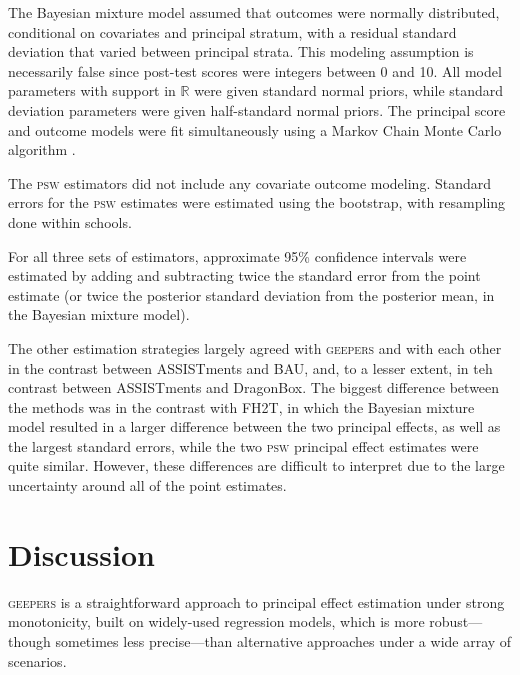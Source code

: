 \documentclass[]{article}
\begin{document}
The Bayesian mixture model assumed that outcomes were normally distributed, conditional on covariates and principal stratum, with a residual standard deviation that varied between principal strata. This modeling assumption is necessarily false since post-test scores were integers between 0 and 10. All model parameters with support in $\mathbb{R}$ were given standard normal priors, while standard deviation parameters were given half-standard normal priors.
The principal score and outcome models were fit simultaneously using a Markov Chain Monte Carlo algorithm \citep{rstan}.

The \textsc{psw} estimators did not include any covariate outcome modeling. Standard errors for the \textsc{psw} estimates were estimated using the bootstrap, with resampling done within schools.

For all three sets of estimators, approximate 95\% confidence intervals were estimated by adding and subtracting twice the standard error from the point estimate (or twice the posterior standard deviation from the posterior mean, in the Bayesian mixture model).

The other estimation strategies largely agreed with \textsc{geepers} and with each other in the contrast between ASSISTments and BAU, and, to a lesser extent, in teh contrast between ASSISTments and DragonBox. The biggest difference between the methods was in the contrast with FH2T, in which the Bayesian mixture model resulted in a larger difference between the two principal effects, as well as the largest standard errors, while the two \textsc{psw} principal effect estimates were quite similar.  However, these differences are difficult to interpret due to the large uncertainty around all of the point estimates.


\section{Discussion}\label{sec:discussion}
\textsc{geepers} is a straightforward approach to principal effect estimation under strong monotonicity, built on widely-used regression models, which is more robust---though sometimes less precise---than alternative approaches under a wide array of scenarios.
\end{document}
